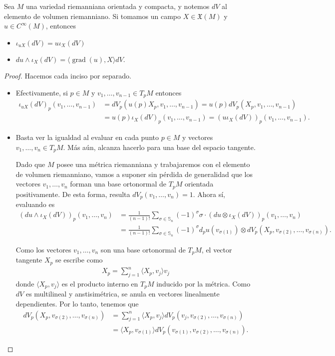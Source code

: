 \documentclass[11pt]{article}
\newcommand{\Ss}{\mathbb{S}}
\newcommand{\X}{\mathfrak{X}}
\newcommand{\grad}{\operatorname{grad}}
\newcommand{\ip}[1]{\langle #1 \rangle}
\newcommand{\paint}[1]{\color{color}{#1}}
\newenvironment{lemma}[2][Lema]{\begin{trivlist}
\item[\hskip \labelsep \paint{{\bfseries #1}}\hskip \labelsep {\bfseries #2.}]}{\end{trivlist}}
\begin{document}
\begin{lemma}{1} Sea $M$ una variedad riemanniana orientada y compacta, y notemos $dV$ al elemento de volumen riemanniano. Si tomamos un campo $X \in \X(M)$ y $u \in C^\infty(M)$, entonces
\begin{itemize}[listparindent = \parindent]
\item[i)] $\iota_{uX}(dV) = u\iota_X(dV)$
\item[ii)] $du \wedge \iota_X(dV) = \ip{\grad(u), X}dV$.
\end{itemize}
\end{lemma}
\begin{proof} Hacemos cada inciso por separado.
\begin{itemize}[listparindent = \parindent]
\item[i)] Efectivamente, si $p \in M$ y $v_1, \dots, v_{n-1} \in T_pM$ entonces
\begin{align*}
\iota_{uX}(dV)_p(v_1, \dots, v_{n-1}) &= dV_p(u(p)X_p,v_1, \dots, v_{n-1}) = u(p)dV_p(X_p,v_1,\dots,v_{n-1})\\
&= u(p)\iota_X(dV)_p(v_1,\dots,v_{n-1}) = (u\iota_X(dV))_p(v_1, \dots, v_{n-1}).
\end{align*}
\item[ii)] Basta ver la igualdad al evaluar en cada punto $p\in M$ y vectores $v_1, \dots, v_{n} \in T_pM$. Más aún, alcanza hacerlo para una base del espacio tangente. 

Dado que $M$ posee una métrica riemanniana y trabajaremos con el elemento de volumen riemanniano, vamos a suponer sin pérdida de generalidad que los vectores $v_1, \dots, v_{n}$ forman una base ortonormal de $T_pM$ orientada positivamente. De esta forma, resulta $dV_p(v_1, \dots, v_n) = 1$. Ahora sí, evaluando es
\begin{align*}
(du \wedge \iota_X(dV))_p(v_1,\dots,v_n) &= \frac{1}{(n-1)!}\sum_{\sigma \in \Ss_{n}}(-1)^\sigma \sigma \cdot (du \otimes \iota_X(dV))_p(v_1, \dots, v_n)\\
&= \frac{1}{(n-1)!}\sum_{\sigma \in \Ss_{n}}(-1)^\sigma d_pu(v_{\sigma(1)}) \otimes dV_p(X_p,v_{\sigma(2)}, \dots, v_{\sigma(n)}).
\end{align*}

Como los vectores $v_1, \dots, v_n$ son una base ortonormal de $T_pM$, el vector tangente $X_p$ se escribe como
\begin{align*}
X_p = \sum_{j=1}^n \ip{X_p,v_j}v_j
\end{align*}
donde $\ip{X_p,v_j}$ es el producto interno en $T_pM$ inducido por la métrica. Como $dV$ es multilineal y anstisimétrica, se anula en vectores linealmente dependientes. Por lo tanto, tenemos que
\begin{align*}
dV_p(X_p,v_{\sigma(2)}, \dots, v_{\sigma(n)}) &= \sum_{j=1}^n \ip{X_p,v_j}dV_p(v_j,v_{\sigma(2)}, \dots, v_{\sigma(n)})\\
& = \ip{X_p,v_{\sigma(1)}}dV_p(v_{\sigma(1)},v_{\sigma(2)}, \dots, v_{\sigma(n)}).
\end{align*}


\end{itemize}
\end{proof}
\end{document}
